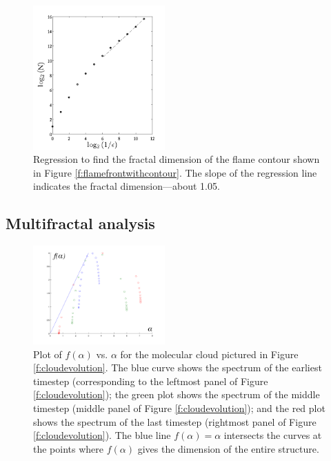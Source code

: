 \documentclass{emulateapj}
\begin{document}
\begin{figure}[ht]
	\begin{center}
	\includegraphics[width=0.45\textwidth,clip=true]{Graphics/logNvsE.png}
	\caption{Regression to find the fractal dimension of the flame contour shown in Figure \ref{f:flamefrontwithcontour}. The slope of the regression line indicates the fractal dimension—about 1.05.
	\label{f:logNvsE}}
	\end{center}
	\end{figure} 


\subsection{Multifractal analysis}\label{MultifractalResults}

\begin{figure}[ht]
	\begin{center}
	\includegraphics[width=0.45\textwidth,clip=true]{Graphics/falphaclouds.png}
	\caption{Plot of $f(\alpha)$ vs. $\alpha$ for the molecular cloud pictured in Figure \ref{f:cloudevolution}. The blue curve shows the spectrum of the earliest timestep (corresponding to the leftmost panel of Figure \ref{f:cloudevolution}); the green plot shows the spectrum of the middle timestep (middle panel of Figure \ref{f:cloudevolution}); and the red plot shows the spectrum of the last timestep (rightmost panel of Figure \ref{f:cloudevolution}). The blue line $f(\alpha) = \alpha $ intersects the curves at the points where $f(\alpha)$ gives the dimension of the entire structure.
	\label{f:falphamultifractal}}
	\end{center}
	\end{figure} 
\end{document}
